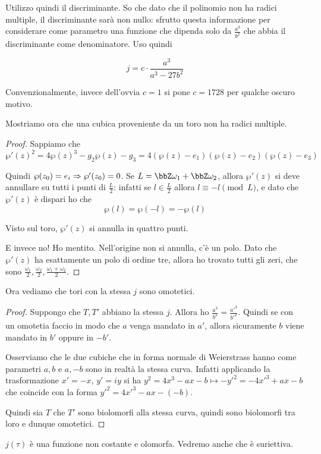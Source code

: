 	Utilizzo quindi il discriminante. So che dato che il polinomio non ha radici multiple, il discriminante sarà non nullo: sfrutto questa informazione per considerare come parametro una funzione che dipenda solo da $\frac{a^3}{b^2}$ che abbia il discriminante come denominatore. Uso quindi

	\[
		j = c \cdot \frac {a^3}{a^3-27b^2}
	\]

	Convenzionalmente, invece dell'ovvia $c=1$ si pone $c=1728$ per qualche oscuro motivo.

	Mostriamo ora che una cubica proveniente da un toro non ha radici multiple.

	\begin{proof}
		Sappiamo che
		\[
			\wp'(z)^2=4\wp(z)^3-g_2\wp(z)-g_3 = 4(\wp(z)-e_1)(\wp(z)-e_2)(\wp(z)-e_3)
		\]

		Quindi $\wp(z_0)=e_i \Rightarrow\wp'(z_0)=0$.
		Se $L=\bbZ\omega_1 + \bbZ\omega_2$, allora $\wp'(z)$ si deve annullare su tutti i punti di $\frac L2$: infatti se $l \in \frac L2$ allora $l \equiv -l \pmod L$, e dato che $\wp'(z)$ è dispari ho che
		\[
			\wp(l) = \wp(-l) = -\wp(l)
		\]

		Visto sul toro, $\wp'(z)$ si annulla in quattro punti.

		E invece no! Ho mentito. Nell'origine non si annulla, c'è un polo. Dato che $\wp'(z)$ ha esattamente un polo di ordine tre, allora ho trovato tutti gli zeri, che sono $\frac{\omega_1}2, \frac{\omega_2}2, \frac{\omega_1+\omega_2}2$.


	\end{proof}

	Ora vediamo che tori con la stessa $j$ sono omotetici.

	\begin{proof}
          Suppongo che $T, T'$ abbiano la stessa $j$. Allora ho $\frac{a^3}{b^2}=\frac{a'^3}{b'^2}$. Quindi se con un omotetia faccio in modo che $a$ venga mandato in $a'$, allora sicuramente $b$ viene mandato in $b'$ oppure in $-b'$.

          Osserviamo che le due cubiche che in forma normale di Weierstrass hanno come parametri $a, b$ e $a, -b$ sono in realtà la stessa curva. Infatti applicando la trasformazione $x' = -x$, $y' = iy$ si ha $y^2 = 4x^3 - ax - b \mapsto - y'^2 = - 4x'^3 + ax - b$ che coincide con la forma $y'^2 = 4x'^3 - ax - (-b)$.

          Quindi sia $T$ che $T'$ sono biolomorfi alla stessa curva, quindi sono biolomorfi tra loro e dunque omotetici.
	\end{proof}

	\begin{osservazione}
		$j(\tau)$ è una funzione non costante e olomorfa. Vedremo anche che è suriettiva.
	\end{osservazione}
